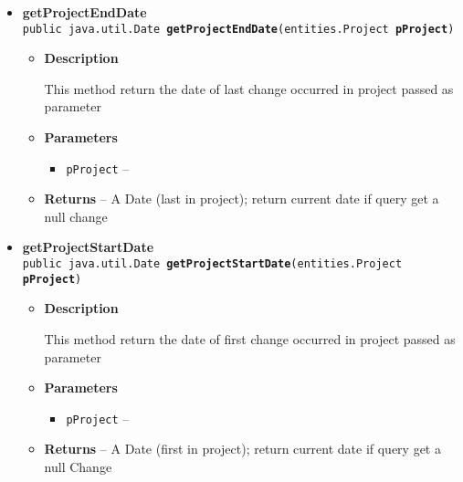 {{{\begin{itemize}
{\begin{itemize}
{This method returns all commits occurred in project passed as parameter
}
\item{
{\bf  Parameters}
  \begin{itemize}
   \item{
\texttt{pProject} -- }
  \end{itemize}
}%
\item{{\bf  Returns} -- 
A list of Change objects 
}%
\end{itemize}
}%
\item{ 
\hypertarget{it.unisa.sesa.repominer.db.ChangeDAO.getProjectEndDate(it.unisa.sesa.repominer.db.entities.Project)}{{\bf  getProjectEndDate}\\}
\texttt{public java.util.Date\ {\bf  getProjectEndDate}(\texttt{entities.Project} {\bf  pProject})
\label{it.unisa.sesa.repominer.db.ChangeDAO.getProjectEndDate(it.unisa.sesa.repominer.db.entities.Project)}}%
\begin{itemize}
\item{
{\bf  Description}

This method return the date of last change occurred in project passed as parameter
}
\item{
{\bf  Parameters}
  \begin{itemize}
   \item{
\texttt{pProject} -- }
  \end{itemize}
}%
\item{{\bf  Returns} -- 
A Date (last in project); return current date if query get a null change 
}%
\end{itemize}
}%
\item{ 
\hypertarget{it.unisa.sesa.repominer.db.ChangeDAO.getProjectStartDate(it.unisa.sesa.repominer.db.entities.Project)}{{\bf  getProjectStartDate}\\}
\texttt{public java.util.Date\ {\bf  getProjectStartDate}(\texttt{entities.Project} {\bf  pProject})
\label{it.unisa.sesa.repominer.db.ChangeDAO.getProjectStartDate(it.unisa.sesa.repominer.db.entities.Project)}}%
\begin{itemize}
\item{
{\bf  Description}

This method return the date of first change occurred in project passed as parameter
}
\item{
{\bf  Parameters}
  \begin{itemize}
   \item{
\texttt{pProject} -- }
  \end{itemize}
}%
\item{{\bf  Returns} -- 
A Date (first in project); return current date if query get a null Change 
}%
\end{itemize}
}%
\end{itemize}
}
}
}
